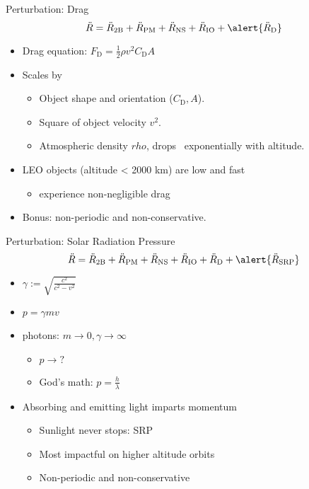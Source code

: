 \documentclass[pdf]{beamer}
\begin{document}
\begin{frame}{Perturbation: Drag}
  \[ \ddot{R} = \ddot{R}_\text{2B} + \ddot{R}_\text{PM} + \ddot{R}_\text{NS}  + \ddot{R}_\text{IO} + \alert{\ddot{R}_\text{D}} \]

  \begin{itemize}
  \item Drag equation: $F_\text{D} = \frac{1}{2}\rho v^2 C_\text{D} A$
  \item Scales by
    \begin{itemize}
    \item Object shape and orientation ($C_\text{D}, A$).
    \item Square of object velocity $v^2$.
    \item Atmospheric density $rho$, drops ~exponentially with altitude.
    \end{itemize}
  \item LEO objects (altitude < 2000 km) are low and fast
    \begin{itemize}
    \item experience non-negligible drag
    \end{itemize}
  \item Bonus: non-periodic and non-conservative.
  \end{itemize}
\end{frame}

\begin{frame}{Perturbation: Solar Radiation Pressure}
  \[ \ddot{R} = \ddot{R}_\text{2B} + \ddot{R}_\text{PM} + \ddot{R}_\text{NS}  + \ddot{R}_\text{IO} + \ddot{R}_\text{D} + \alert{\ddot{R}_\text{SRP}}\]

  \begin{itemize}
  \item $\gamma := \sqrt{\frac{c^2}{c^2 - v^2}}$
  \item $ p = \gamma m v$
  \item photons: $m\rightarrow0, \gamma \rightarrow \infty $
    \begin{itemize}
    \item $p \rightarrow ?$
    \item God's math: $ p = \frac{h}{\lambda} $
    \end{itemize}
  \item Absorbing and emitting light imparts momentum
    \begin{itemize}
    \item Sunlight never stops: SRP
    \item Most impactful on higher altitude orbits
    \item Non-periodic and non-conservative
    \end{itemize}
  \end{itemize}
\end{frame}
\end{document}

